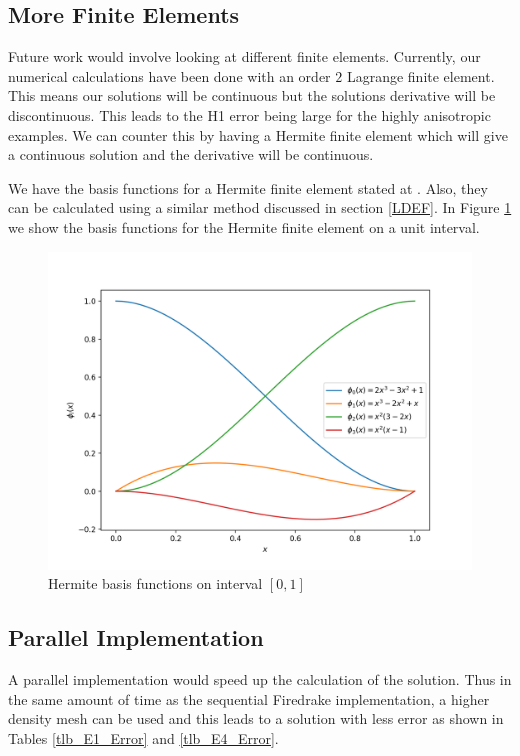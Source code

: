 \documentclass[12pt]{ociamthesis}
\begin{document}
\subsection{More Finite Elements} \label{FE_HER}
Future work would involve looking at different finite elements. Currently, our numerical calculations have been done with an order $2$ Lagrange finite element. This means our solutions will be continuous but the solutions derivative will be discontinuous. This leads to the H1 error being large for the highly anisotropic examples. We can counter this by having a Hermite finite element which will give a continuous solution and the derivative will be continuous.

We have the basis functions for a Hermite finite element stated at \cite{defelement}. Also, they can be calculated using a similar method discussed in section \ref{LDEF}. In Figure \ref{InterFuncsHER} we show the basis functions for the Hermite finite element on a unit interval.

\begin{figure}[H]
     \includegraphics[width=\textwidth]{Pics/BasisFunc/IntervalFuncsHER.png}
     \caption{Hermite basis functions on interval $[0,1]$}
     \label{InterFuncsHER}
\end{figure}

\subsection{Parallel Implementation} \label{GMRES_GPU}
A parallel implementation would speed up the calculation of the solution. Thus in the same amount of time as the sequential Firedrake implementation, a higher density mesh can be used and this leads to a solution with less error as shown in Tables \ref{tlb_E1_Error} and \ref{tlb_E4_Error}.
\end{document}
